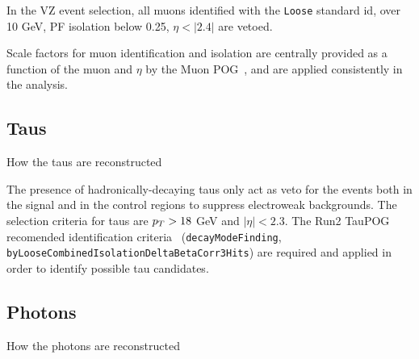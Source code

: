 
In the VZ event selection, all muons identified with the \texttt{Loose} standard id, \pt over 10 GeV, PF isolation below 0.25, $\eta<|2.4|$ are vetoed.

 
Scale factors for muon identification and isolation are centrally provided as a function of the muon \pt and $\eta$ by the Muon POG~\cite{MuonSF}, and are applied consistently in the analysis.


\subsection{Taus}\label{sec:tau}
{\color{red} How the taus are reconstructed}
 
The presence of hadronically-decaying taus only act as veto for the events both in the signal and in the control regions to suppress electroweak backgrounds. The selection criteria for taus are $p_T > 18$ GeV and $|\eta| < 2.3$. The Run2 TauPOG recomended identification criteria~\cite{TauPOG} (\texttt{decayModeFinding}, \texttt{byLooseCombinedIsolationDeltaBetaCorr3Hits})  are required and applied in order to identify possible tau candidates.
% 
\subsection{Photons}
{\color{red} How the photons are reconstructed}

